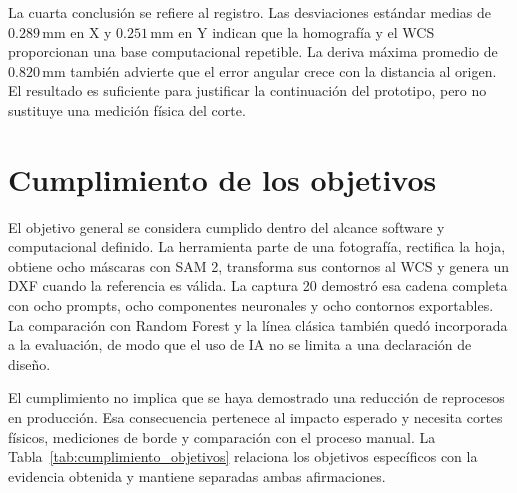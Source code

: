 La cuarta conclusión se refiere al registro. Las desviaciones estándar medias de $0.289\,\text{mm}$ en X y $0.251\,\text{mm}$ en Y indican que la homografía y el WCS proporcionan una base computacional repetible. La deriva máxima promedio de $0.820\,\text{mm}$ también advierte que el error angular crece con la distancia al origen. El resultado es suficiente para justificar la continuación del prototipo, pero no sustituye una medición física del corte.

\section{Cumplimiento de los objetivos}

El objetivo general se considera cumplido dentro del alcance software y computacional definido. La herramienta parte de una fotografía, rectifica la hoja, obtiene ocho máscaras con SAM 2, transforma sus contornos al WCS y genera un DXF cuando la referencia es válida. La captura 20 demostró esa cadena completa con ocho prompts, ocho componentes neuronales y ocho contornos exportables. La comparación con Random Forest y la línea clásica también quedó incorporada a la evaluación, de modo que el uso de IA no se limita a una declaración de diseño.

El cumplimiento no implica que se haya demostrado una reducción de reprocesos en producción. Esa consecuencia pertenece al impacto esperado y necesita cortes físicos, mediciones de borde y comparación con el proceso manual. La Tabla~\ref{tab:cumplimiento_objetivos} relaciona los objetivos específicos con la evidencia obtenida y mantiene separadas ambas afirmaciones.

